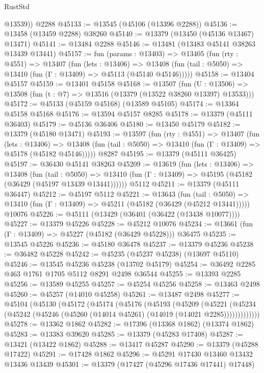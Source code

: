\begin{lexlean}{RustStd}
\begin{coremodule}
        @13539))
    @2288
@45133 := @13545 (@45106 (@13396 @2288))
@45136 := @13458 (@13459 @2288) @38260
@45140 := @13379 (@13450 (@45136 @13467) @13471)
@45141 := @13484 @2288
@45146 := @13481 (@13483 @45141 @38263 @13439 @13441)
@45157 := fun (params : @13403) =>
  @13405
    (fun (rty : @4551) =>
    @13407
      (fun (lets : @13406) =>
      @13408 (fun (tail : @5050) => @13410 (fun (Γ : @13409) => @45113 (@45140 @45146)))))
@45158 := @13404 @45157
@45159 := @13401 @45158
@45168 := @13507
    (fun (U : @13506) => @13508 (fun (t : @7) => @13516 (@13379 (@13522 @38260 @13397) @13533)))
@45172 := @45133 (@45159 @45168) (@13589 @45105)
@45174 := @13364 @45158 @45168
@45176 := @13594 @45157 @8285
@45178 := @13379 (@45111 @36403)
@45179 := @45136 @36406
@45180 := @13450 @45179
@45182 := @13379 (@45180 @13471)
@45193 := @13597
    (fun (rty : @4551) =>
    @13407
      (fun (lets : @13406) =>
      @13408 (fun (tail : @5050) => @13410 (fun (Γ : @13409) => @45178 (@45182 @45146)))))
    @8287
@45195 := @13379 (@45111 @36425)
@45197 := @36430 @45141 @38263
@45209 := @13619
    (fun (lets : @13406) =>
    @13408
      (fun (tail : @5050) =>
      @13410 (fun (Γ : @13409) => @45195 (@45182 (@36429 (@45197 @13439 @13441))))))
    @5112
@45211 := @13379 (@45111 @36447)
@45212 := @45197 @5112
@45221 := @13643
    (fun (tail : @5050) => @13410 (fun (Γ : @13409) => @45211 (@45182 (@36429 (@45212 @13441)))))
    @10076
@45226 := @45111 (@13429 (@36401 (@36422 (@13438 @10077))))
@45227 := @13379 @45226
@45228 := @45212 @10076
@45234 := @13661 (fun (Γ : @13409) => @45227 (@45182 (@36429 @45228))) @36475
@45235 := @13545 @45226
@45236 := @45180 @36478
@45237 := @13379 @45236
@45238 := @36482 @45228
@45242 := @45235 (@45237 @45238) (@13697 @45110)
@45246 := @13545 @45236 @45238 (@13702 @45179)
@45254 := @36492 @2285 @463 @1761 @1705 @5112 @8291 @2498 @36544
@45255 := @13393 @2285
@45256 := @13589 @45255
@45257 := @45254 @45256
@45258 := @13463 @2498
@45260 := @45257 (@14010 @45258)
@45261 := @13487 @2498
@45277 := @45104
    (@45130
      (@45172
        (@45174
          (@45176
            (@45193
              (@45209
                (@45221
                  (@45234 (@45242 (@45246 (@45260 (@14014 @45261) (@14019 (@14021 @2285)))))))))))))
@45278 := @13362 @1862
@45282 := @17396 (@13368 @1862) (@13374 @1862)
@45283 := @13383 @39620
@45285 := @13379 (@45283 @17408)
@45287 := @13421 (@13422 @1862)
@45288 := @13417 @45287
@45290 := @13379 (@45288 @17422)
@45291 := @17428 @1862
@45296 := @45291 @17430 @13460 @13432 @13436 @13439
@45301 := @13379 (@17427 (@45296 @17436 @17441) @17448)

\end{coremodule}
\end{lexlean}
